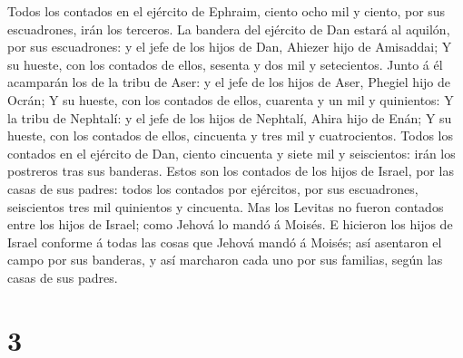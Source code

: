 Todos los contados en el ejército de Ephraim, ciento ocho mil y ciento,
por sus escuadrones, irán los terceros.  La bandera del
ejército de Dan estará al aquilón, por sus escuadrones: y el jefe de los
hijos de Dan, Ahiezer hijo de Amisaddai;  Y su hueste,
con los contados de ellos, sesenta y dos mil y setecientos.
 Junto á él acamparán los de la tribu de Aser: y el jefe
de los hijos de Aser, Phegiel hijo de Ocrán;  Y su
hueste, con los contados de ellos, cuarenta y un mil y quinientos:
 Y la tribu de Nephtalí: y el jefe de los hijos de
Nephtalí, Ahira hijo de Enán;  Y su hueste, con los
contados de ellos, cincuenta y tres mil y cuatrocientos. 
Todos los contados en el ejército de Dan, ciento cincuenta y siete mil y
seiscientos: irán los postreros tras sus banderas.  Estos
son los contados de los hijos de Israel, por las casas de sus padres:
todos los contados por ejércitos, por sus escuadrones, seiscientos tres
mil quinientos y cincuenta.  Mas los Levitas no fueron
contados entre los hijos de Israel; como Jehová lo mandó á Moisés.
 E hicieron los hijos de Israel conforme á todas las
cosas que Jehová mandó á Moisés; así asentaron el campo por sus
banderas, y así marcharon cada uno por sus familias, según las casas de
sus padres.

\hypertarget{section-2}{%
\section{3}\label{section-2}}

